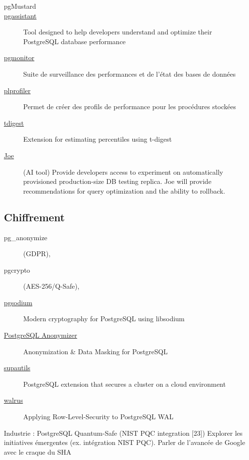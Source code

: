 \documentclass[a4paper,12pt]{article}
\begin{document}
\begin{multicols*}{2}
\begin{description}
\item[{pgMustard}] 

\item[{\href{https://github.com/nexsol-technologies/pgassistant}{pgassistant}}] Tool designed to help developers understand and optimize their PostgreSQL database performance
\item[{\href{https://github.com/CrunchyData/pgmonitor-extension}{pgmonitor}}] Suite de surveillance des performances et de l'état des bases de données
\item[{\href{https://github.com/bigsql/plprofiler}{plprofiler}}] Permet de créer des profils de performance pour les procédures stockées
\item[{\href{https://github.com/tvondra/tdigest}{tdigest}}] Extension for estimating percentiles using t-digest
\item[{\href{https://gitlab.com/postgres-ai/joe}{Joe}}] (AI tool) Provide developers access to experiment on automatically provisioned production-size DB testing replica. Joe will provide recommendations for query optimization and the ability to rollback.
\end{description}
\subsection*{Chiffrement}
\label{sec:org22c2988}
\begin{description}
\item[{pg\_anonymize}] (GDPR),
\item[{pgcrypto}] (AES-256/Q-Safe),
\item[{\href{https://github.com/michelp/pgsodium}{pgsodium}}] Modern cryptography for PostgreSQL using libsodium
\item[{\href{https://gitlab.com/dalibo/postgresql\_anonymizer}{PostgreSQL Anonymizer}}] Anonymization \& Data Masking for PostgreSQL
\item[{\href{https://github.com/supabase/supautils}{supautils}}] PostgreSQL extension that secures a cluster on a cloud environment
\item[{\href{https://github.com/supabase/walrus}{walrus}}] Applying Row-Level-Security to PostgreSQL WAL
\end{description}

Industrie : PostgreSQL Quantum-Safe (NIST PQC integration [23])
Explorer les initiatives émergentes (ex. intégration NIST PQC).
Parler de l'avancée de Google avec le craque du SHA

\end{multicols*}
\end{document}
